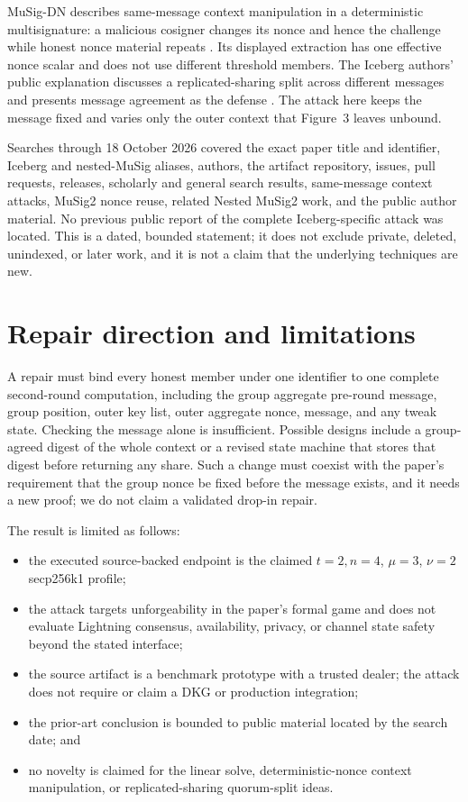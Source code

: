 \documentclass[10pt,a4paper]{article}
\begin{document}
MuSig-DN describes same-message context manipulation in a deterministic
multisignature: a malicious cosigner changes its nonce and hence the challenge
while honest nonce material repeats \cite{musigdn}. Its displayed extraction
has one effective nonce scalar and does not use different threshold members.
The Iceberg authors' public explanation discusses a replicated-sharing split
across different messages and presents message agreement as the defense
\cite{icebergblog}. The attack here keeps the message fixed and varies only
the outer context that Figure~3 leaves unbound.

Searches through 18 October 2026 covered the exact paper title and identifier,
Iceberg and nested-MuSig aliases, authors, the artifact repository, issues,
pull requests, releases, scholarly and general search results, same-message
context attacks, MuSig2 nonce reuse, related Nested MuSig2 work, and the public
author material. No previous public report of the complete Iceberg-specific
attack was located. This is a dated, bounded statement; it does not exclude
private, deleted, unindexed, or later work, and it is not a claim that the
underlying techniques are new.

\section{Repair direction and limitations}

A repair must bind every honest member under one identifier to one complete
second-round computation, including the group aggregate pre-round message,
group position, outer key list, outer aggregate nonce, message, and any tweak
state. Checking the message alone is insufficient. Possible designs include a
group-agreed digest of the whole context or a revised state machine that stores
that digest before returning any share. Such a change must coexist with the
paper's requirement that the group nonce be fixed before the message exists,
and it needs a new proof; we do not claim a validated drop-in repair.

The result is limited as follows:
\begin{itemize}
  \item the executed source-backed endpoint is the claimed $t=2,n=4$,
        $\mu=3$, $\nu=2$ secp256k1 profile;
  \item the attack targets unforgeability in the paper's formal game and does
        not evaluate Lightning consensus, availability, privacy, or channel
        state safety beyond the stated interface;
  \item the source artifact is a benchmark prototype with a trusted dealer;
        the attack does not require or claim a DKG or production integration;
  \item the prior-art conclusion is bounded to public material located by the
        search date; and
  \item no novelty is claimed for the linear solve, deterministic-nonce
        context manipulation, or replicated-sharing quorum-split ideas.
\end{itemize}
\end{document}

